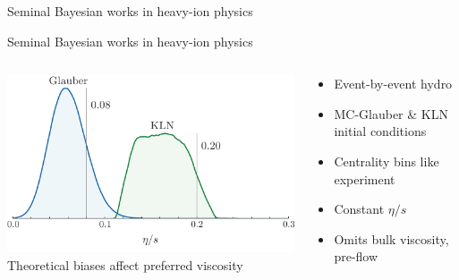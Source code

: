 \documentclass{beamer}
\begin{document}
\begin{frame}{Seminal Bayesian works in heavy-ion physics}
\end{frame}

\begin{frame}{Seminal Bayesian works in heavy-ion physics}
  \begin{columns}[T]
    \begin{column}{0.55\textwidth}
      \centering
      \includegraphics[width=\textwidth]{post_compare}\\
      {\scriptsize Theoretical biases affect preferred viscosity}
    \end{column}
    \begin{column}{0.45\textwidth}
      \begin{itemize}
        \item Event-by-event hydro
        \item MC-Glauber \& KLN initial conditions
        \item Centrality bins like experiment
        \item Constant $\eta/s$
        \item Omits bulk viscosity, pre-flow
      \end{itemize}
    \end{column}
  \end{columns}
  \vspace{1cm}
  \begin{columns}[T]
    \begin{column}{0.025\textwidth}
    \end{column}
    \begin{column}{0.05\textwidth}
      \raggedleft

\end{column}
\end{columns}
\end{frame}
\end{document}
